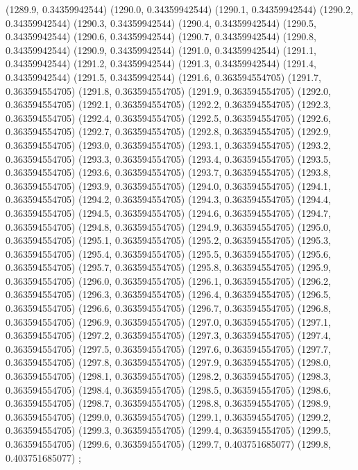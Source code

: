 {					(1289.9, 0.34359942544)
					(1290.0, 0.34359942544)
					(1290.1, 0.34359942544)
					(1290.2, 0.34359942544)
					(1290.3, 0.34359942544)
					(1290.4, 0.34359942544)
					(1290.5, 0.34359942544)
					(1290.6, 0.34359942544)
					(1290.7, 0.34359942544)
					(1290.8, 0.34359942544)
					(1290.9, 0.34359942544)
					(1291.0, 0.34359942544)
					(1291.1, 0.34359942544)
					(1291.2, 0.34359942544)
					(1291.3, 0.34359942544)
					(1291.4, 0.34359942544)
					(1291.5, 0.34359942544)
					(1291.6, 0.363594554705)
					(1291.7, 0.363594554705)
					(1291.8, 0.363594554705)
					(1291.9, 0.363594554705)
					(1292.0, 0.363594554705)
					(1292.1, 0.363594554705)
					(1292.2, 0.363594554705)
					(1292.3, 0.363594554705)
					(1292.4, 0.363594554705)
					(1292.5, 0.363594554705)
					(1292.6, 0.363594554705)
					(1292.7, 0.363594554705)
					(1292.8, 0.363594554705)
					(1292.9, 0.363594554705)
					(1293.0, 0.363594554705)
					(1293.1, 0.363594554705)
					(1293.2, 0.363594554705)
					(1293.3, 0.363594554705)
					(1293.4, 0.363594554705)
					(1293.5, 0.363594554705)
					(1293.6, 0.363594554705)
					(1293.7, 0.363594554705)
					(1293.8, 0.363594554705)
					(1293.9, 0.363594554705)
					(1294.0, 0.363594554705)
					(1294.1, 0.363594554705)
					(1294.2, 0.363594554705)
					(1294.3, 0.363594554705)
					(1294.4, 0.363594554705)
					(1294.5, 0.363594554705)
					(1294.6, 0.363594554705)
					(1294.7, 0.363594554705)
					(1294.8, 0.363594554705)
					(1294.9, 0.363594554705)
					(1295.0, 0.363594554705)
					(1295.1, 0.363594554705)
					(1295.2, 0.363594554705)
					(1295.3, 0.363594554705)
					(1295.4, 0.363594554705)
					(1295.5, 0.363594554705)
					(1295.6, 0.363594554705)
					(1295.7, 0.363594554705)
					(1295.8, 0.363594554705)
					(1295.9, 0.363594554705)
					(1296.0, 0.363594554705)
					(1296.1, 0.363594554705)
					(1296.2, 0.363594554705)
					(1296.3, 0.363594554705)
					(1296.4, 0.363594554705)
					(1296.5, 0.363594554705)
					(1296.6, 0.363594554705)
					(1296.7, 0.363594554705)
					(1296.8, 0.363594554705)
					(1296.9, 0.363594554705)
					(1297.0, 0.363594554705)
					(1297.1, 0.363594554705)
					(1297.2, 0.363594554705)
					(1297.3, 0.363594554705)
					(1297.4, 0.363594554705)
					(1297.5, 0.363594554705)
					(1297.6, 0.363594554705)
					(1297.7, 0.363594554705)
					(1297.8, 0.363594554705)
					(1297.9, 0.363594554705)
					(1298.0, 0.363594554705)
					(1298.1, 0.363594554705)
					(1298.2, 0.363594554705)
					(1298.3, 0.363594554705)
					(1298.4, 0.363594554705)
					(1298.5, 0.363594554705)
					(1298.6, 0.363594554705)
					(1298.7, 0.363594554705)
					(1298.8, 0.363594554705)
					(1298.9, 0.363594554705)
					(1299.0, 0.363594554705)
					(1299.1, 0.363594554705)
					(1299.2, 0.363594554705)
					(1299.3, 0.363594554705)
					(1299.4, 0.363594554705)
					(1299.5, 0.363594554705)
					(1299.6, 0.363594554705)
					(1299.7, 0.403751685077)
					(1299.8, 0.403751685077)
				};
